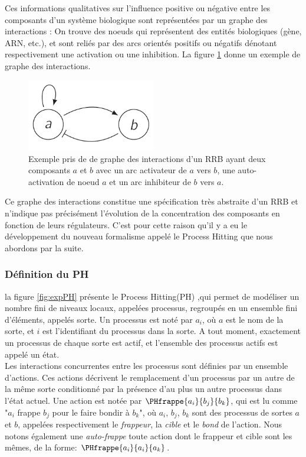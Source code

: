 Ces informations qualitatives sur l’influence positive ou négative entre les composants d’un système
biologique sont représentées par un graphe des interactions : On trouve des noeuds qui représentent des entités biologiques (gène, ARN, etc.), et sont reliés par
des arcs orientés positifs ou négatifs dénotant respectivement une activation ou une inhibition. La figure \ref{expThomas} donne un exemple de graphe des interactions.\\
\begin{figure}[!ht]
    \center
    \includegraphics[width=0.5\textwidth]{./images/expThoma.png}
    \caption{Exemple pris de \cite{pauleve2011modelisation} de graphe des interactions d'un RRB ayant deux composants $a$ et $b$ avec un arc activateur de $a$ vers $b$, une auto-activation de noeud $a$ et un arc inhibiteur de $b$ vers $a$.}
    \label{expThomas}
\end{figure}

Ce graphe des interactions constitue une spécification très abstraite d’un RRB et n’indique
pas précisément l’évolution de la concentration des composants en fonction de leurs régulateurs. C'est pour cette raison qu'il y a eu le développement du nouveau formalisme appelé le Process Hitting que nous abordons par la suite.


\subsubsection{Définition du PH}
\label{secDefPH}

la figure \ref{fig:expPH} présente le  Process Hitting(PH)\cite{pauleve2011modelisation}
,qui permet de modéliser un nombre fini de niveaux locaux, appelées processus, regroupés en un ensemble fini d'éléments, appelés sorte. Un processus est noté par $a_i$, où $a$ est le nom de la sorte, et $i$ est l'identifiant du processus dans la sorte. A tout moment, exactement un processus de chaque sorte est actif, et l'ensemble des processus actifs est appelé un état.\\
Les interactions concurrentes entre les processus sont définies par un ensemble d'actions. Ces actions décrivent le remplacement d'un processus par un autre de  la même sorte conditionné par la présence d'au plus un autre processus dans l'état actuel. Une action est notée par $\PHfrappe{a_i}{b_j}{b_k}$, qui est lu comme "$a_i$ frappe $b_j$ pour le faire bondir à $b_k$", où $a_i$, $b_j$, $b_k$ sont des processus de sortes $a$ et $b$, appelées respectivement le \emph{frappeur}, la \emph{cible} et le \emph{bond} de l'action. Nous notons également une \emph{auto-frappe} toute action dont le frappeur et cible sont les mêmes, de la forme: $\PHfrappe{a_i}{a_i}{a_k}$.

